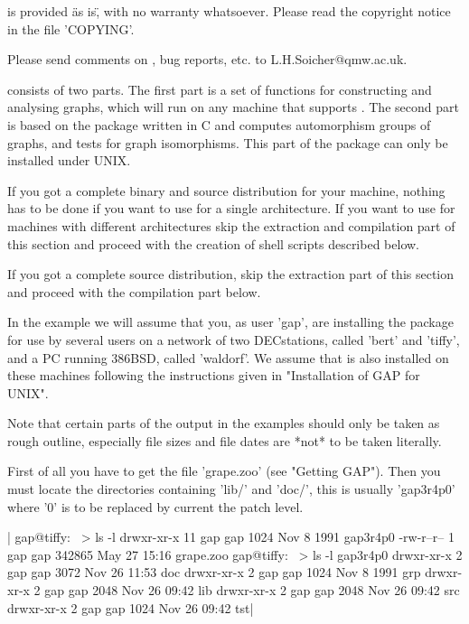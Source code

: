 {\GRAPE} is provided \"as is\", with no warranty whatsoever.  Please read 
the  copyright  notice  in the file 'COPYING'.

Please   send   comments    on   {\GRAPE},   bug    reports,   etc.    to
L.H.Soicher@qmw.ac.uk.


{\GRAPE} consists  of  two  parts.  The first  part  is  a set of  {\GAP}
functions  for constructing and analysing  graphs,  which will run on any
machine that supports  {\GAP}.  The second part is  based on the {\nauty}
package written  in C  and  computes automorphism  groups of  graphs, and
tests  for graph isomorphisms.  This  part  of the  package  can only  be
installed under UNIX.

If you  got a complete binary and  source distribution for  your machine,
nothing   has to be   done  if you  want   to use {\GRAPE}  for  a single
architecture.  If you  want to  use  {\GRAPE} for machines with different
architectures  skip the extraction and   compilation part of this section
and proceed with the creation of shell scripts described below.

If you  got a complete source distribution,  skip the  extraction part of
this section and proceed with the compilation part below.

In the example we will assume that you, as user 'gap', are installing the
{\GRAPE}  package  for  use  by  several  users  on  a  network   of  two
DECstations, called  'bert' and 'tiffy',  and a PC running 386BSD, called
'waldorf'.  We assume that {\GAP}  is  also  installed on  these machines
following the instructions given in "Installation of GAP for UNIX".

Note that certain parts  of  the  output  in the examples should  only be
taken as rough outline, especially file sizes and file dates are *not* to
be taken literally.

First of  all you have to get  the file  'grape.zoo' (see "Getting GAP").
Then you must locate the {\GAP} directories containing 'lib/' and 'doc/',
this is usually  'gap3r4p0' where '0' is to   be replaced by  current the
patch level.

|    gap@tiffy:~ > ls -l
    drwxr-xr-x  11 gap      gap          1024 Nov  8  1991 gap3r4p0
    -rw-r--r--   1 gap      gap        342865 May 27 15:16 grape.zoo
    gap@tiffy:~ > ls -l gap3r4p0
    drwxr-xr-x   2 gap      gap          3072 Nov 26 11:53 doc
    drwxr-xr-x   2 gap      gap          1024 Nov  8  1991 grp
    drwxr-xr-x   2 gap      gap          2048 Nov 26 09:42 lib
    drwxr-xr-x   2 gap      gap          2048 Nov 26 09:42 src
    drwxr-xr-x   2 gap      gap          1024 Nov 26 09:42 tst|

